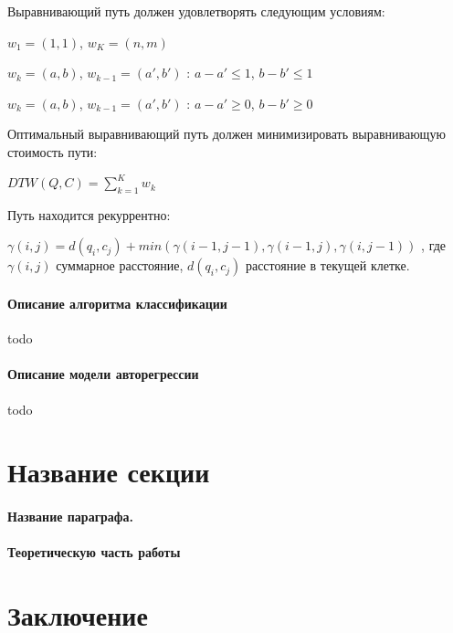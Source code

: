 \documentclass[12pt,twoside]{article}
\begin{document}
				Выравнивающий путь должен удовлетворять следующим условиям:
				
				$w_1=(1,1)$, $w_K=(n, m)$
				
				$w_k = (a, b)$, $w_{k-1}=(a', b')$ : $a-a' \leq 1$, $b-b' \leq 1$ 
				
				$w_k = (a, b)$, $w_{k-1}=(a', b')$ : $a-a' \geq 0$, $b-b'\geq 0$
				
				Оптимальный выравнивающий путь должен минимизировать выравнивающую стоимость пути:
				
				$DTW(Q, C)=\displaystyle\sum_{k=1}^{K} w_k$
				
				Путь находится рекуррентно:
				
				$\gamma(i, j) = d(q_i, c_j) + min({\gamma(i-1, j-1), \gamma(i-1, j), \gamma(i, j-1)})$ , где $\gamma(i, j)$ суммарное расстояние, $d(q_i, c_j)$ расстояние в текущей клетке.
				
				\paragraph{Описание алгоритма классификации}
				
				todo
				
				\paragraph{Описание модели авторегрессии}
				
				todo
				
				
		
		\section{Название секции}
    \paragraph{Название параграфа.}
    \paragraph{Теоретическую часть работы}
    \section{Заключение}

		 
    
    
    
\end{document}
